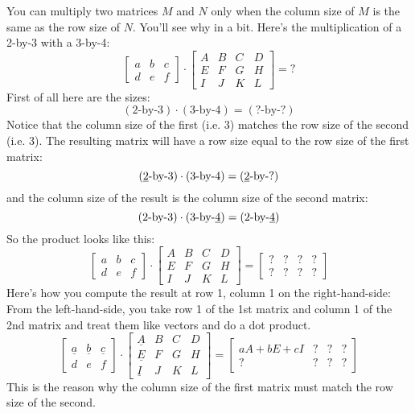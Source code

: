 You can multiply two matrices $M$ and $N$ only when the 
column size of $M$ is the same as the row size of $N$.
You'll see why in a bit.
Here's the multiplication of a 2-by-3 with a 3-by-4:
\[
\begin{bmatrix}
a & b & c \\
d & e & f 
\end{bmatrix}
\cdot
\begin{bmatrix}
A & B & C & D \\
E & F & G & H \\
I & J & K & L  
\end{bmatrix}
= ?
\]
First of all here are the sizes:
\[
(\text{2-by-3}) \cdot (\text{3-by-4}) = (\text{?-by-?})
\]
Notice that the column size of the first (i.e. 3)
matches the row size of the second (i.e. 3).
The resulting matrix will have a row size equal to the row size of the 
first matrix:
\[
(\text{\underline{2}-by-3}) \cdot (\text{3-by-4}) = (\text{\underline{2}-by-?})
\]
and the column size of the result is the column size of the second matrix:
\[
(\text{2-by-3}) \cdot (\text{3-by-\underline{4}}) = (\text{2-by-\underline{4}})
\]
So the product looks like this:
\[
\begin{bmatrix}
a & b & c \\
d & e & f 
\end{bmatrix}
\cdot
\begin{bmatrix}
A & B & C & D \\
E & F & G & H \\
I & J & K & L  
\end{bmatrix}
= 
\begin{bmatrix}
? & ? & ? & ? \\
? & ? & ? & ?
\end{bmatrix}
\]
Here's how you compute the result at row 1, column 1 on the right-hand-side:
From the left-hand-side,
you take row 1 of the 1st matrix and column 1 of the 2nd 
matrix and treat them like vectors and do a dot product.
\[
\begin{bmatrix}
\underline{a} & \underline{b} & \underline{c} \\
d & e & f 
\end{bmatrix}
\cdot
\begin{bmatrix}
\underline{A} & B & C & D \\
\underline{E} & F & G & H \\
\underline{I} & J & K & L  
\end{bmatrix}
= 
\begin{bmatrix}
aA + bE + cI & ? & ? & ? \\
? & ? & ? & ?
\end{bmatrix}
\]
This is the reason why the column size of the first matrix
must match the row size of the second.

